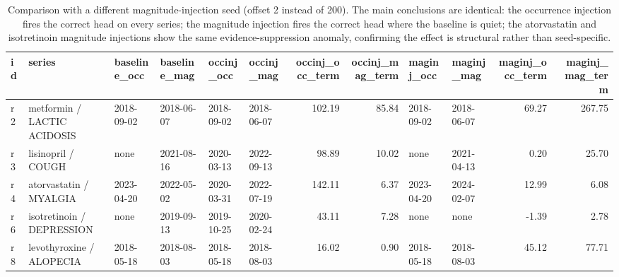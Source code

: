 \begin{table}

\caption{Comparison with a different magnitude-injection seed (offset 2 instead of 200). The main conclusions are identical: the occurrence injection fires the correct head on every series; the magnitude injection fires the correct head where the baseline is quiet; the atorvastatin and isotretinoin magnitude injections show the same evidence-suppression anomaly, confirming the effect is structural rather than seed-specific.}
\centering
\begin{tabular}[t]{llllllrrllrr}
\toprule
id & series & baseline\_occ & baseline\_mag & occinj\_occ & occinj\_mag & occinj\_occ\_term & occinj\_mag\_term & maginj\_occ & maginj\_mag & maginj\_occ\_term & maginj\_mag\_term\\
\midrule
r2 & metformin / LACTIC ACIDOSIS & 2018-09-02 & 2018-06-07 & 2018-09-02 & 2018-06-07 & 102.19 & 85.84 & 2018-09-02 & 2018-06-07 & 69.27 & 267.75\\
r3 & lisinopril / COUGH & none & 2021-08-16 & 2020-03-13 & 2022-09-13 & 98.89 & 10.02 & none & 2021-04-13 & 0.20 & 25.70\\
r4 & atorvastatin / MYALGIA & 2023-04-20 & 2022-05-02 & 2020-03-31 & 2022-07-19 & 142.11 & 6.37 & 2023-04-20 & 2024-02-07 & 12.99 & 6.08\\
r6 & isotretinoin / DEPRESSION & none & 2019-09-13 & 2019-10-25 & 2020-02-24 & 43.11 & 7.28 & none & none & -1.39 & 2.78\\
r8 & levothyroxine / ALOPECIA & 2018-05-18 & 2018-08-03 & 2018-05-18 & 2018-08-03 & 16.02 & 0.90 & 2018-05-18 & 2018-08-03 & 45.12 & 77.71\\
\bottomrule
\end{tabular}
\end{table}
